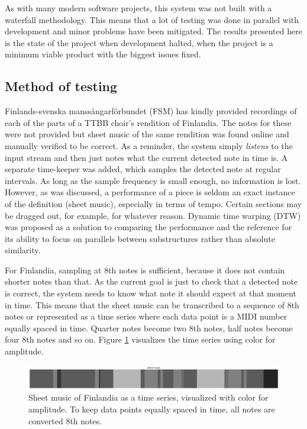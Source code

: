 As with many modern software projects, this system was not built with a waterfall methodology. This means that a lot of testing was done in parallel with development and minor problems have been mitigated. The results presented here is the state of the project when development halted, when the project is a minimum viable product with the biggest issues fixed.

\subsection{Method of testing}
Finlands-svenska manssångarförbundet (FSM) has kindly provided recordings of each of the parts of a TTBB choir's rendition of Finlandia. The notes for these were not provided but sheet music of the same rendition was found online and manually verified to be correct. As a reminder, the system simply \textit{listens} to the input stream and then just notes what the current detected note in time is. A separate time-keeper was added, which samples the detected note at regular intervals. As long as the sample frequency is small enough, no information is lost. However, as was discussed, a performance of a piece is seldom an exact instance of the definition (sheet music), especially in terms of tempo. Certain sections may be dragged out, for example, for whatever reason. Dynamic time warping (DTW) was proposed as a solution to comparing the performance and the reference for its ability to focus on parallels between substructures rather than absolute similarity.

For Finlandia, sampling at 8th notes is sufficient, because it does not contain shorter notes than that. As the current goal is just to check that a detected note is correct, the system needs to know what note it should expect at that moment in time. This means that the sheet music can be transcribed to a sequence of 8th notes or represented as a time series where each data point is a MIDI number equally spaced in time. Quarter notes become two 8th notes, half notes become four 8th notes and so on. Figure \ref{fig:sheetEncoding} visualizes the time series using color for amplitude.

\begin{figure}[ht]
    \centering
    \includegraphics[width=\textwidth]{./images/sheetEncoding.png}
    \caption{Sheet music of Finlandia as a time series, visualized with color for amplitude. To keep data points equally spaced in time, all notes are converted 8th notes. \label{fig:sheetEncoding}}
\end{figure}

